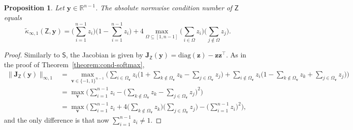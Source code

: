 \documentclass[namedate,webpdf,imanum]{ima-authoring-template}
\newcommand{\Real}{\mathbb{R}}
\newcommand{\Matrix}[1]{\mathbf{#1}}
\newcommand{\trans}{\intercal}
\newcommand{\diag}[2][]{\mathrm{diag}#1( #2 #1)}
\newcommand{\Norm}[3][]{#1\| #2 #1\|_{\mathrm{#3}}}
\newcommand{\Layer}[1]{\mathsf{#1}}
\newcommand{\condabs}[3][]{\tilde{\kappa}_{\mathrm{#2}} #1( #3 #1)}
\newtheorem{proposition}[theorem]{Proposition}%
\numberwithin{equation}{section}
\begin{document}
\begin{proposition}
\label{proposition:condabs-softmax-reduced}
Let $\Matrix{y} \in \Real^{n-1}$. The absolute normwise condition number of $\Layer{Z}$ equals
\begin{equation*}
    \condabs{\infty,1}{\Layer{Z}, \Matrix{y}} = \bigg( \sum_{i = 1}^{n-1} z_i \bigg) \bigg( 1 - \sum_{i = 1}^{n-1} z_i \bigg) + 4 \max_{\Omega \subseteq [1,n-1]} \bigg( \sum_{i \in \Omega} z_i \bigg) \bigg( \sum_{j \not\in \Omega} z_j \bigg).
\end{equation*}
\end{proposition}
\begin{proof}
Similarly to $\Layer{S}$, the Jacobian is given by $\Matrix{J}_{\Layer{Z}}(\Matrix{y}) = \diag{\Matrix{z}} - \Matrix{z} \Matrix{z}^\trans$.
As in the proof of Theorem~\ref{theorem:cond-softmax},
\begin{align*}
    \Norm{\Matrix{J}_{\Layer{Z}}(\Matrix{y})}{\infty,1} &= \max_{\Matrix{v} \in \{ -1,1 \}^{n-1}} \bigg( \sum_{i \in \Omega_{\Matrix{v}}} z_i \Big( 1 + \sum_{k \not\in \Omega_{\Matrix{v}}} z_k - \sum_{j \in \Omega_{\Matrix{v}}} z_j \Big) + \sum_{i \not\in \Omega_{\Matrix{v}}} z_i \Big( 1 - \sum_{k \not\in \Omega_{\Matrix{v}}} z_k + \sum_{j \in \Omega_{\Matrix{v}}} z_j \Big) \bigg) \\
    &= \max_{\Matrix{v}} \bigg( \sum_{i = 1}^{n-1} z_i - \Big(\sum_{k \not\in \Omega_{\Matrix{v}}} z_k - \sum_{j \in \Omega_{\Matrix{v}}} z_j\Big)^2 \bigg) \\
    &= \max_{\Matrix{v}} \bigg( \sum_{i = 1}^{n-1} z_i + 4 \Big( \sum_{k \not\in \Omega_{\Matrix{v}}} z_k \Big) \Big( \sum_{j \in \Omega_{\Matrix{v}}} z_j \Big) - \Big( \sum_{i = 1}^{n-1} z_i \Big)^2 \bigg),
\end{align*}
and the only difference is that now $\sum_{i = 1}^{n-1} z_i \neq 1$.
\end{proof}
\end{document}
